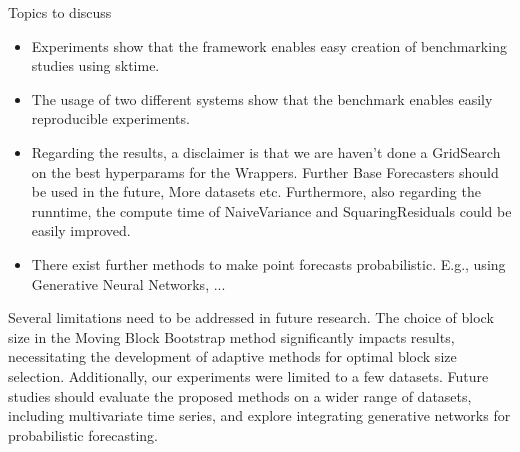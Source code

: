Topics to discuss
\begin{itemize}
    \item Experiments show that the framework enables easy creation of benchmarking studies using sktime.
    \item The usage of two different systems show that the benchmark enables easily reproducible experiments.
    \item Regarding the results, a disclaimer is that we are haven't done a GridSearch on the best hyperparams for the Wrappers. Further Base Forecasters should be used in the future, More datasets etc.
    Furthermore, also regarding the runntime, the compute time of NaiveVariance and SquaringResiduals could be easily improved. 
    \item There exist further methods to make point forecasts probabilistic. E.g., using Generative Neural Networks, ...
\end{itemize}



Several limitations need to be addressed in future research. The choice of block size in the Moving Block Bootstrap method significantly impacts results, necessitating the development of adaptive methods for optimal block size selection. Additionally, our experiments were limited to a few datasets. Future studies should evaluate the proposed methods on a wider range of datasets, including multivariate time series, and explore integrating generative networks for probabilistic forecasting.

